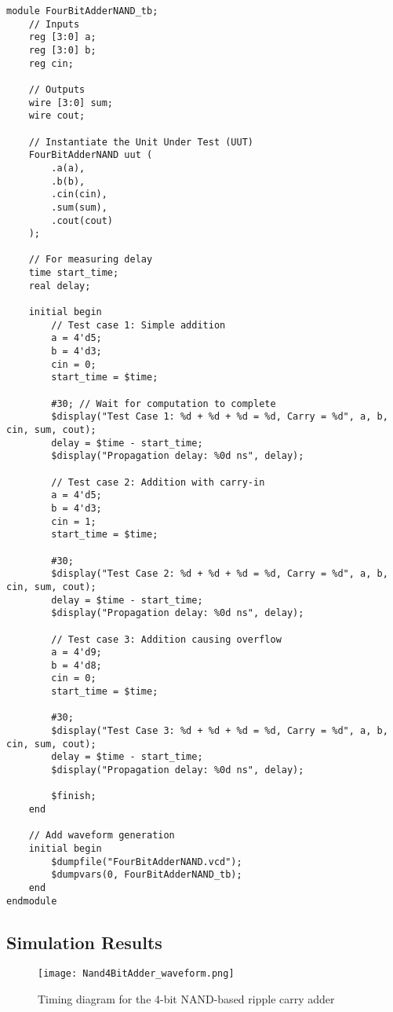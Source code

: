 \documentclass{article}
\begin{document}
\begin{lstlisting}
module FourBitAdderNAND_tb;
    // Inputs
    reg [3:0] a;
    reg [3:0] b;
    reg cin;
    
    // Outputs
    wire [3:0] sum;
    wire cout;
    
    // Instantiate the Unit Under Test (UUT)
    FourBitAdderNAND uut (
        .a(a),
        .b(b),
        .cin(cin),
        .sum(sum),
        .cout(cout)
    );
    
    // For measuring delay
    time start_time;
    real delay;
    
    initial begin
        // Test case 1: Simple addition
        a = 4'd5;
        b = 4'd3;
        cin = 0;
        start_time = $time;
        
        #30; // Wait for computation to complete
        $display("Test Case 1: %d + %d + %d = %d, Carry = %d", a, b, cin, sum, cout);
        delay = $time - start_time;
        $display("Propagation delay: %0d ns", delay);
        
        // Test case 2: Addition with carry-in
        a = 4'd5;
        b = 4'd3;
        cin = 1;
        start_time = $time;
        
        #30;
        $display("Test Case 2: %d + %d + %d = %d, Carry = %d", a, b, cin, sum, cout);
        delay = $time - start_time;
        $display("Propagation delay: %0d ns", delay);
        
        // Test case 3: Addition causing overflow
        a = 4'd9;
        b = 4'd8;
        cin = 0;
        start_time = $time;
        
        #30;
        $display("Test Case 3: %d + %d + %d = %d, Carry = %d", a, b, cin, sum, cout);
        delay = $time - start_time;
        $display("Propagation delay: %0d ns", delay);
        
        $finish;
    end
    
    // Add waveform generation
    initial begin
        $dumpfile("FourBitAdderNAND.vcd");
        $dumpvars(0, FourBitAdderNAND_tb);
    end
endmodule
\end{lstlisting}

\subsection{Simulation Results}

\begin{figure}[H]
	\centering
	\texttt{[image: Nand4BitAdder\_waveform.png]}
	\caption{Timing diagram for the 4-bit NAND-based ripple carry adder}
	\label{fig:Nand4BitAdder_waveform}
\end{figure}
\end{document}
